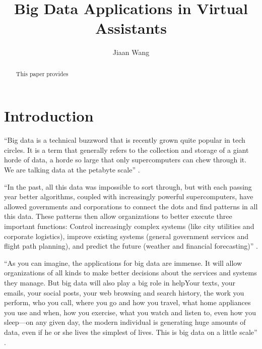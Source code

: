 \title{Big Data Applications in Virtual Assistants}

\author{Jiaan Wang}

\begin{abstract}

    This paper provides
    
\end{abstract}


\maketitle

\section{Introduction}

``Big data is a technical buzzword that is recently grown quite popular in tech circles. It is a term that generally refers to the collection and storage of a giant horde of data, a horde so large that only supercomputers can chew through it. We are talking data at the petabyte scale'' \cite{Tal2015internet}.

``In the past, all this data was impossible to sort through, but with each passing year better algorithms, coupled with increasingly powerful supercomputers, have allowed governments and corporations to connect the dots and find patterns in all this data. These patterns then allow organizations to better execute three important functions: Control increasingly complex systems (like city utilities and corporate logistics), improve existing systems (general government services and flight path planning), and predict the future (weather and financial forecasting)'' \cite{Tal2015internet}.

``As you can imagine, the applications for big data are immense. It will allow organizations of all kinds to make better decisions about the services and systems they manage. But big data will also play a big role in helpYour texts, your emails, your social posts, your web browsing and search history, the work you perform, who you call, where you go and how you travel, what home appliances you use and when, how you exercise, what you watch and listen to, even how you sleep—on any given day, the modern individual is generating huge amounts of data, even if he or she lives the simplest of lives. This is big data on a little scale'' \cite{Tal2015internet}.

